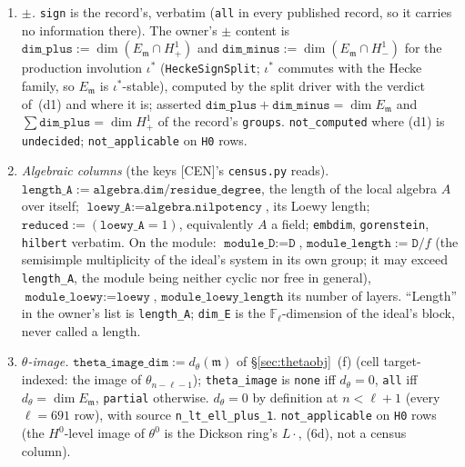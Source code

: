 \documentclass[11pt]{article}
\theoremstyle{remark}
\newcommand{\F}{\mathbb{F}}
\newcommand{\Fl}{\F_\ell}
\DeclareMathOperator{\rank}{rank}
\newcommand{\m}{\mathfrak{m}}
\begin{document}
\begin{enumerate}[label=(\alph*)]
\begin{enumerate}[label=(d\arabic*)]
    conjunction $\texttt{label\_type}=\texttt{eisenstein}$ (at $\ell\le13$) or a confirmed
    \texttt{kummer\_tag} (at $\ell=691$) with $\texttt{boundary\_split}=\texttt{mixed}$.
    \emph{Invariants} (per cell, asserted by the split driver): $\sum\dim E_\m=\dim H^1$ over the
    \texttt{H1} rows; $\sum\texttt{rank\_r1}=\rank r^1=\dim H^1-\dim H^1_!$.
  \item \emph{$\pm$.} \texttt{sign} is the record's, verbatim (\texttt{all} in every published
    record, so it carries no information there). The owner's $\pm$ content is
    $\texttt{dim\_plus}:=\dim(E_\m\cap H^1_+)$ and $\texttt{dim\_minus}:=\dim(E_\m\cap H^1_-)$ for the
    production involution $\iota^\ast$ (\texttt{HeckeSignSplit}; $\iota^\ast$ commutes with the
    Hecke family, so $E_\m$ is $\iota^\ast$-stable), computed by the split driver with the verdict
    of~(d1) and where it is; asserted $\texttt{dim\_plus}+\texttt{dim\_minus}=\dim E_\m$ and
    $\sum\texttt{dim\_plus}=\dim H^1_+$ of the record's \texttt{groups}. \texttt{not\_computed}
    where (d1) is \texttt{undecided}; \texttt{not\_applicable} on \texttt{H0} rows.
  \item \emph{Algebraic columns} (the keys [CEN]'s \texttt{census.py} reads).
    $\texttt{length\_A}:=\texttt{algebra.dim}/\texttt{residue\_degree}$, the length of the local
    algebra $A$ over itself; $\texttt{loewy\_A}:=\texttt{algebra.nilpotency}$, its Loewy length;
    $\texttt{reduced}:=(\texttt{loewy\_A}=1)$, equivalently $A$ a field;
    \texttt{embdim}, \texttt{gorenstein}, \texttt{hilbert} verbatim. On the module:
    $\texttt{module\_D}:=\texttt{D}$, $\texttt{module\_length}:=\texttt{D}/f$ (the semisimple
    multiplicity of the ideal's system in its own group; it may exceed \texttt{length\_A}, the
    module being neither cyclic nor free in general), $\texttt{module\_loewy}:=\texttt{loewy}$,
    $\texttt{module\_loewy\_length}$ its number of layers. ``Length'' in the owner's list is
    \texttt{length\_A}; \texttt{dim\_E} is the $\Fl$-dimension of the ideal's block, never
    called a length.
  \item \emph{$\theta$-image.} $\texttt{theta\_image\_dim}:=d_\theta(\m)$ of
    \S\ref{sec:thetaobj}~(f) (cell target-indexed: the image of $\theta_{n-\ell-1}$);
    \texttt{theta\_image} is \texttt{none} iff $d_\theta=0$, \texttt{all} iff $d_\theta=\dim E_\m$,
    \texttt{partial} otherwise. $d_\theta=0$ by definition at $n<\ell+1$ (every $\ell=691$ row), with
    source \texttt{n\_lt\_ell\_plus\_1}. \texttt{not\_applicable} on \texttt{H0} rows (the
    $H^0$-level image of $\theta^0$ is the Dickson ring's $L\cdot$, (6d), not a census column).

\end{enumerate}
\end{enumerate}
\end{document}
